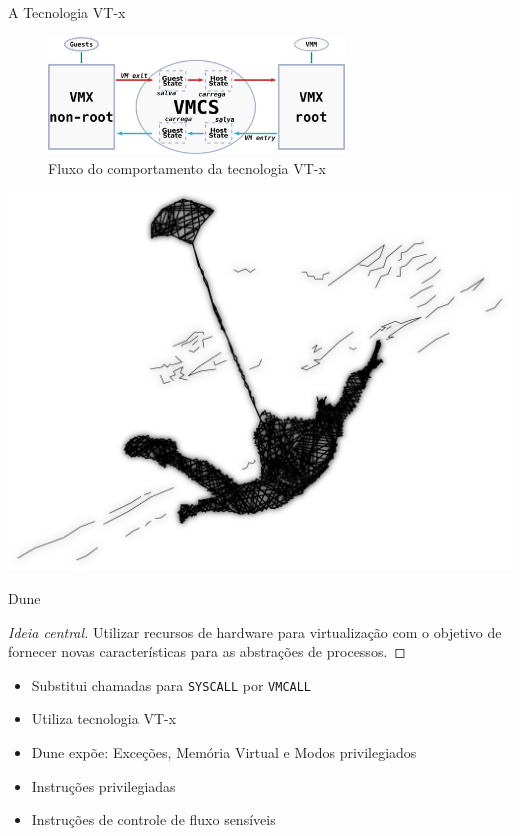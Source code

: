 \documentclass[xcolor={usenames,svgnames,dvipsnames},brazil,english,12pt,aspectratio=149]{beamer}
\begin{document}
\begin{frame}{A Tecnologia VT-x}
  \begin{figure}[!h]
    \centering
    \includegraphics[width=0.7\textwidth]{vt-x_flow} 
    \caption{Fluxo do comportamento da tecnologia VT-x}
    \label{fig:vt-x_flow}
  \end{figure}
\end{frame}

\begin{frame}[plain]
  \includegraphics[width=\textwidth]{presentation_cap2_zero}
\end{frame}

\begin{frame}{Dune}

  \begin{proof}[Ideia central]
Utilizar recursos de hardware para virtualização com o objetivo de fornecer
novas características para as abstrações de processos.
  \end{proof}

    \begin{itemize}
      \item Substitui chamadas para \texttt{SYSCALL} por \texttt{VMCALL}
      \item Utiliza tecnologia VT-x
      \item Dune expõe: Exceções, Memória Virtual e Modos privilegiados
      \item Instruções privilegiadas
      \item Instruções de controle de fluxo sensíveis
    \end{itemize}

\end{frame}
\end{document}
